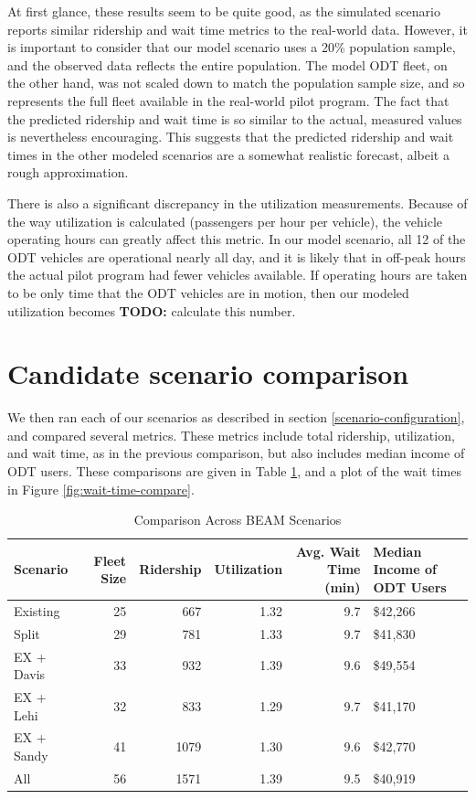 \documentclass[
]{report}
\begin{document}
At first glance, these results seem to be quite good, as the simulated scenario reports similar ridership and wait time metrics to the real-world data. However, it is important to consider that our model scenario uses a 20\% population sample, and the observed data reflects the entire population. The model ODT fleet, on the other hand, was not scaled down to match the population sample size, and so represents the full fleet available in the real-world pilot program. The fact that the predicted ridership and wait time is so similar to the actual, measured values is nevertheless encouraging. This suggests that the predicted ridership and wait times in the other modeled scenarios are a somewhat realistic forecast, albeit a rough approximation.

There is also a significant discrepancy in the utilization measurements. Because of the way utilization is calculated (passengers per hour per vehicle), the vehicle operating hours can greatly affect this metric. In our model scenario, all 12 of the ODT vehicles are operational nearly all day, and it is likely that in off-peak hours the actual pilot program had fewer vehicles available. If operating hours are taken to be only time that the ODT vehicles are in motion, then our modeled utilization becomes \textbf{TODO:} calculate this number.

\hypertarget{candidate-scenario-comparison}{%
\section{Candidate scenario comparison}\label{candidate-scenario-comparison}}

We then ran each of our scenarios as described in section \ref{scenario-configuration}, and compared several metrics. These metrics include total ridership, utilization, and wait time, as in the previous comparison, but also includes median income of ODT users. These comparisons are given in Table \ref{tab:scenario-compare}, and a plot of the wait times in Figure \ref{fig:wait-time-compare}.

\begin{table}

\caption{\label{tab:scenario-compare}Comparison Across BEAM Scenarios}
\centering
\begin{tabular}[t]{lrrrrl}
\toprule
Scenario & Fleet Size & Ridership & Utilization & Avg. Wait Time (min) & Median Income of ODT Users\\
\midrule
Existing & 25 & 667 & 1.32 & 9.7 & \$42,266\\
Split & 29 & 781 & 1.33 & 9.7 & \$41,830\\
EX + Davis & 33 & 932 & 1.39 & 9.6 & \$49,554\\
EX + Lehi & 32 & 833 & 1.29 & 9.7 & \$41,170\\
EX + Sandy & 41 & 1079 & 1.30 & 9.6 & \$42,770\\
\addlinespace
All & 56 & 1571 & 1.39 & 9.5 & \$40,919\\
\bottomrule
\end{tabular}
\end{table}
\end{document}
